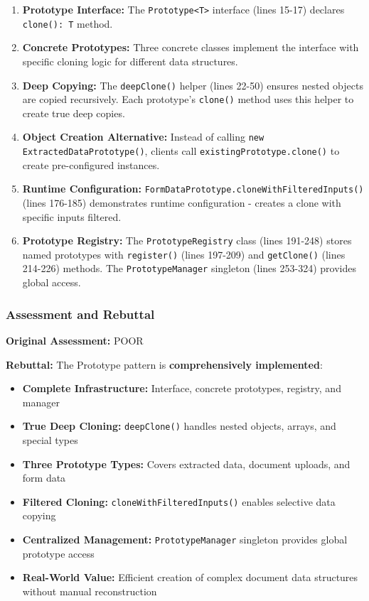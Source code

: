 \documentclass[11pt]{article}
\begin{document}
\begin{enumerate}[noitemsep]
    \item \textbf{Prototype Interface:} The \texttt{Prototype<T>} interface (lines 15-17) declares \texttt{clone(): T} method.

    \item \textbf{Concrete Prototypes:} Three concrete classes implement the interface with specific cloning logic for different data structures.

    \item \textbf{Deep Copying:} The \texttt{deepClone()} helper (lines 22-50) ensures nested objects are copied recursively. Each prototype's \texttt{clone()} method uses this helper to create true deep copies.

    \item \textbf{Object Creation Alternative:} Instead of calling \texttt{new ExtractedDataPrototype()}, clients call \texttt{existingPrototype.clone()} to create pre-configured instances.

    \item \textbf{Runtime Configuration:} \texttt{FormDataPrototype.cloneWithFilteredInputs()} (lines 176-185) demonstrates runtime configuration - creates a clone with specific inputs filtered.

    \item \textbf{Prototype Registry:} The \texttt{PrototypeRegistry} class (lines 191-248) stores named prototypes with \texttt{register()} (lines 197-209) and \texttt{getClone()} (lines 214-226) methods. The \texttt{PrototypeManager} singleton (lines 253-324) provides global access.
\end{enumerate}

\subsubsection{Assessment and Rebuttal}
\textbf{Original Assessment:} POOR

\textbf{Rebuttal:} The Prototype pattern is \textbf{comprehensively implemented}:

\begin{itemize}[noitemsep]
    \item \textbf{Complete Infrastructure:} Interface, concrete prototypes, registry, and manager
    \item \textbf{True Deep Cloning:} \texttt{deepClone()} handles nested objects, arrays, and special types
    \item \textbf{Three Prototype Types:} Covers extracted data, document uploads, and form data
    \item \textbf{Filtered Cloning:} \texttt{cloneWithFilteredInputs()} enables selective data copying
    \item \textbf{Centralized Management:} \texttt{PrototypeManager} singleton provides global prototype access
    \item \textbf{Real-World Value:} Efficient creation of complex document data structures without manual reconstruction
\end{itemize}
\end{document}
